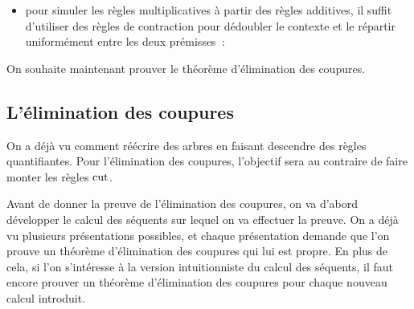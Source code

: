 \begin{itemize}
\item pour simuler les règles multiplicatives à partir des règles additives,
  il suffit d'utiliser des règles de contraction pour dédoubler le contexte et
  le répartir uniformément entre les deux prémisses~:
  \begin{center}
  \end{center}
\end{itemize}

\noindent
On souhaite maintenant prouver le théorème d'élimination des coupures.

\subsection{L'élimination des coupures}

On a déjà vu comment réécrire des arbres en faisant descendre des règles
quantifiantes. Pour l'élimination des coupures, l'objectif sera au contraire de
faire monter les règles $\operatorname{cut}$.

Avant de donner la preuve de l'élimination des coupures, on va d'abord
développer le calcul des séquents sur lequel on va effectuer la preuve. On a
déjà vu plusieurs présentations possibles, et chaque présentation demande que
l'on prouve un théorème d'élimination des coupures qui lui est propre. En plus
de cela, si l'on s'intéresse à la version intuitionniste du calcul des
séquents, il faut encore prouver un théorème d'élimination des coupures pour
chaque nouveau calcul introduit.

